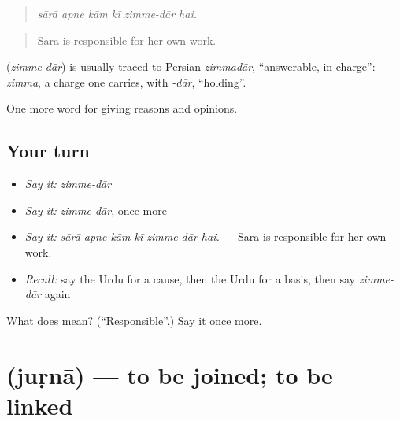 \begin{quote}
      
\end{quote}

\begin{quote}
\emph{sārā apne kām kī zimme-dār hai.}
\end{quote}

\begin{quote}
Sara is responsible for her own work.
\end{quote}

\begin{cousinweb}
\textbf{ } (\emph{zimme-dār}) is usually traced to Persian \emph{zimmadār}, \textquotedblleft{}answerable, in charge\textquotedblright{}: \emph{zimma}, a charge one carries, with \emph{-dār}, \textquotedblleft{}holding\textquotedblright{}.
\end{cousinweb}

\begin{grammarlens}[title={What you've built}]
One more word for giving reasons and opinions.
\end{grammarlens}

\subsection*{Your turn}
\begin{itemize}
\raggedright
  \item \emph{Say it:} \emph{zimme-dār}
  \item \emph{Say it:} \emph{zimme-dār}, once more
  \item \emph{Say it:} \emph{sārā apne kām kī zimme-dār hai.} — Sara is responsible for her own work.
  \item \emph{Recall:} say the Urdu for a cause, then the Urdu for a basis, then say \emph{zimme-dār} again
\end{itemize}

\begin{tcolorbox}[breakable,colback=teal!4,colframe=teal!35!black,title={Before you move on}]
What does   mean? (\textquotedblleft{}Responsible\textquotedblright{}.) Say it once more.
\end{tcolorbox}
\section[\texorpdfstring{\ur{جڑنا} (juṛnā)}{جڑنا (juṛnā)}]{ (juṛnā) — to be joined; to be linked}

